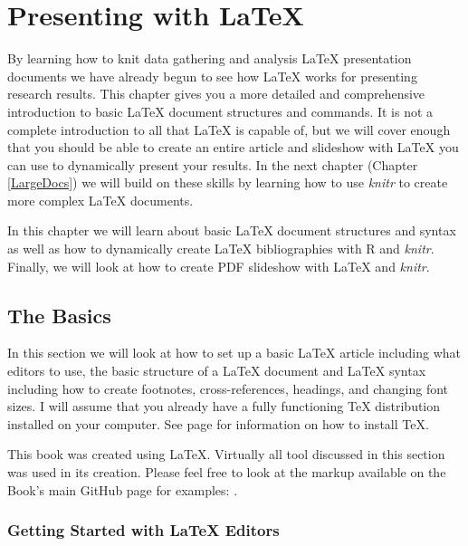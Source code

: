 



\chapter{Presenting with LaTeX}\label{LatexChapter}

By learning how to knit data gathering and analysis LaTeX presentation documents we have already begun to see how LaTeX works for presenting research results. This chapter gives you a more detailed and comprehensive introduction to basic LaTeX document structures and commands. It is not a complete introduction to all that LaTeX is capable of, but we will cover enough that you should be able to create an entire article and slideshow with LaTeX you can use to dynamically present your results. In the next chapter (Chapter \ref{LargeDocs}) we will build on these skills by learning how to use {\emph{knitr}} to create more complex LaTeX documents. 

In this chapter we will learn about basic LaTeX document structures and syntax as well as how to dynamically create LaTeX bibliographies with R and \emph{knitr}. Finally, we will look at how to create PDF slideshow with LaTeX and \emph{knitr}. 

\section{The Basics}

In this section we will look at how to set up a basic LaTeX article including what editors to use, the basic structure of a LaTeX document and LaTeX syntax including how to create footnotes, cross-references, headings, and changing font sizes. I will assume that you already have a fully functioning TeX distribution installed on your computer. See page \pageref{InstallMarkup} for information on how to install TeX.

This book was created using LaTeX. Virtually all tool discussed in this section was used in its creation. Please feel free to look at the markup available on the Book's main GitHub page for examples: \url{}.

\subsection{Getting Started with LaTeX Editors}

